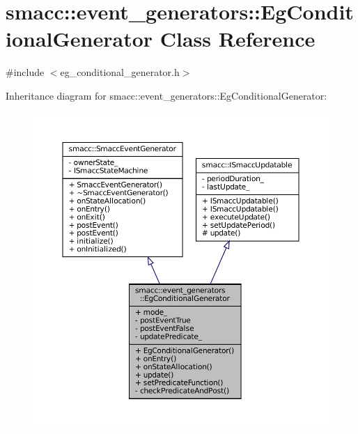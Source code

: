 \hypertarget{classsmacc_1_1event__generators_1_1EgConditionalGenerator}{}\section{smacc\+:\+:event\+\_\+generators\+:\+:Eg\+Conditional\+Generator Class Reference}
\label{classsmacc_1_1event__generators_1_1EgConditionalGenerator}


{\ttfamily \#include $<$eg\+\_\+conditional\+\_\+generator.\+h$>$}



Inheritance diagram for smacc\+:\+:event\+\_\+generators\+:\+:Eg\+Conditional\+Generator\+:
\nopagebreak
\begin{figure}[H]
\begin{center}
\leavevmode
\includegraphics[width=350pt]{classsmacc_1_1event__generators_1_1EgConditionalGenerator__inherit__graph}
\end{center}
\end{figure}


